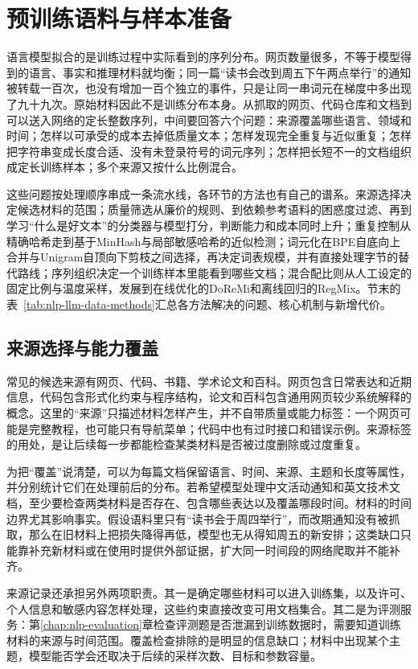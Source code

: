 \section{预训练语料与样本准备}
\label{sec:nlp-llm-data}

语言模型拟合的是训练过程中实际看到的序列分布。网页数量很多，不等于模型得到的语言、事实和推理材料就均衡；同一篇“读书会改到周五下午两点举行”的通知被转载一百次，也没有增加一百个独立的事件，只是让同一串词元在梯度中多出现了九十九次。原始材料因此不是训练分布本身。从抓取的网页、代码仓库和文档到可以送入网络的定长整数序列，中间要回答六个问题：来源覆盖哪些语言、领域和时间；怎样以可承受的成本去掉低质量文本；怎样发现完全重复与近似重复；怎样把字符串变成长度合适、没有未登录符号的词元序列；怎样把长短不一的文档组织成定长训练样本；多个来源又按什么比例混合。

这些问题按处理顺序串成一条流水线，各环节的方法也有自己的谱系。来源选择决定候选材料的范围；质量筛选从廉价的规则、到依赖参考语料的困惑度过滤、再到学习“什么是好文本”的分类器与模型打分，判断能力和成本同时上升；重复控制从精确哈希走到基于MinHash与局部敏感哈希的近似检测；词元化在BPE自底向上合并与Unigram自顶向下剪枝之间选择，再决定词表规模，并有直接处理字节的替代路线；序列组织决定一个训练样本里能看到哪些文档；混合配比则从人工设定的固定比例与温度采样，发展到在线优化的DoReMi和离线回归的RegMix。节末的表~\ref{tab:nlp-llm-data-methods}汇总各方法解决的问题、核心机制与新增代价。

\subsection{来源选择与能力覆盖}
\label{sec:nlp-llm-data-sources}

常见的候选来源有网页、代码、书籍、学术论文和百科。网页包含日常表达和近期信息，代码包含形式化约束与程序结构，论文和百科包含通用网页较少系统解释的概念。这里的“来源”只描述材料怎样产生，并不自带质量或能力标签：一个网页可能是完整教程，也可能只有导航菜单；代码中也有过时接口和错误示例。来源标签的用处，是让后续每一步都能检查某类材料是否被过度删除或过度重复。

为把“覆盖”说清楚，可以为每篇文档保留语言、时间、来源、主题和长度等属性，并分别统计它们在处理前后的分布。若希望模型处理中文活动通知和英文技术文档，至少要检查两类材料是否存在、包含哪些表达以及覆盖哪段时间。材料的时间边界尤其影响事实。假设语料里只有“读书会于周四举行”，而改期通知没有被抓取，那么在旧材料上把损失降得再低，模型也无从得知周五的新安排；这类缺口只能靠补充新材料或在使用时提供外部证据，扩大同一时间段的网络爬取并不能补齐。

来源记录还承担另外两项职责。其一是确定哪些材料可以进入训练集，以及许可、个人信息和敏感内容怎样处理，这些约束直接改变可用文档集合。其二是为评测服务：第\ref{chap:nlp-evaluation}章检查评测题是否泄漏到训练数据时，需要知道训练材料的来源与时间范围。覆盖检查排除的是明显的信息缺口；材料中出现某个主题，模型能否学会还取决于后续的采样次数、目标和参数容量。


